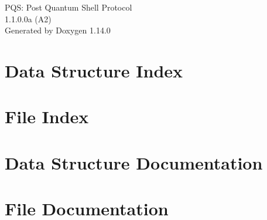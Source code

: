 \documentclass[twoside]{book}
\newcommand{\+}{\discretionary{\mbox{\scriptsize$\hookleftarrow$}}{}{}}
\newcommand{\clearemptydoublepage}{%
    \newpage{\pagestyle{empty}\cleardoublepage}%
  }
\begin{document}
  \raggedbottom
    \hypersetup{pageanchor=false,
                bookmarksnumbered=true,
                pdfencoding=unicode
               }
  \begin{titlepage}
  \vspace*{7cm}
  \begin{center}%
  {\Large PQS\+: Post Quantum Shell Protocol}\\
  [1ex]\large 1.\+1.\+0.\+0a (\+A2) \\
  \vspace*{1cm}
  {\large Generated by Doxygen 1.14.0}\\
  \end{center}
  \end{titlepage}
  \clearemptydoublepage
  \tableofcontents
  \clearemptydoublepage
  \hypersetup{pageanchor=true}

\chapter{Data Structure Index}

\chapter{File Index}

\chapter{Data Structure Documentation}













\chapter{File Documentation}
























  \backmatter
  \newpage
  \clearemptydoublepage
  \printindex
\end{document}
